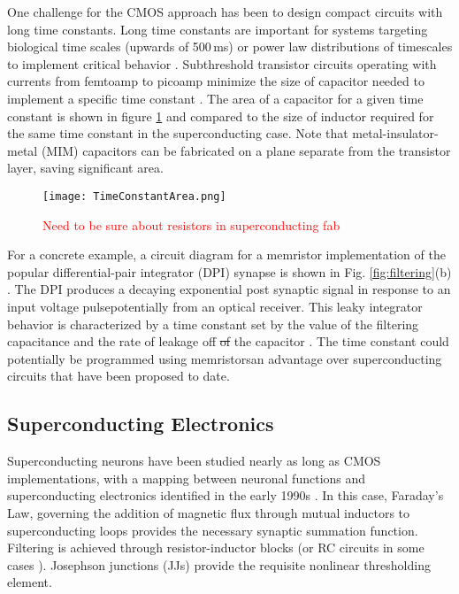 \documentclass[twocolumn]{article}
\begin{document}
One challenge for the CMOS approach has been to design compact circuits with long time constants. Long time constants are important for systems targeting biological time scales (upwards of 500\,ms) \cite{}  or power law distributions of timescales to implement critical behavior \cite{be2007}. Subthreshold transistor circuits operating with currents from femtoamp to picoamp minimize the size of capacitor needed to implement a specific time constant \cite{}. The area of a capacitor for a given time constant is shown in figure \ref{fig:TimeConstant} and compared to the size of inductor required for the same time constant in the superconducting case. Note that metal-insulator-metal (MIM) capacitors can be fabricated on a plane separate from the transistor layer, saving significant area.
\begin{figure}
    \centering
    \texttt{[image: TimeConstantArea.png]}
    \caption{\textcolor{Red}{Need to be sure about resistors in superconducting fab}}
    \label{fig:TimeConstant}
\end{figure}

For a concrete example, a circuit diagram for a memristor implementation of the popular differential-pair integrator (DPI) synapse is shown in Fig. \ref{fig:filtering}(b) \cite{dalgaty2019hybrid}. The DPI produces a decaying exponential post synaptic signal in response to an input voltage pulse\textemdash potentially from an optical receiver. This leaky integrator behavior is characterized by a time constant set by the value of the filtering capacitance and the rate of leakage off \sout{of} the capacitor \cite{chicca2014neuromorphic}. The time constant could potentially be programmed using memristors\textemdash an advantage over superconducting circuits that have been proposed to date.

\subsection{Superconducting Electronics}
Superconducting neurons have been studied nearly as long as CMOS implementations, with a mapping between neuronal functions and superconducting electronics identified in the early 1990s \cite{hago1991, hiak1991}. In this case, Faraday's Law, governing the addition of magnetic flux through mutual inductors to superconducting loops provides the necessary synaptic summation function. Filtering is achieved through resistor-inductor blocks (or RC circuits in some cases \cite{crotty2010josephson}). Josephson junctions (JJs) provide the requisite nonlinear thresholding element.
\end{document}
